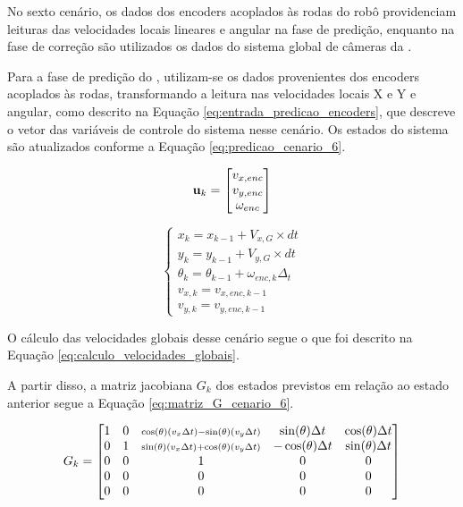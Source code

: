 \documentclass[acronym, symbols, table]{fei}
\begin{document}
			No sexto cenário, os dados dos encoders acoplados às rodas do robô providenciam leituras das velocidades locais lineares e angular na fase de predição, enquanto na fase de correção são utilizados os dados do sistema global de câmeras da .
			
			Para a fase de predição do , utilizam-se os dados provenientes dos encoders acoplados às rodas, transformando a leitura nas velocidades locais X e Y e angular, como descrito na Equação \ref{eq:entrada_predicao_encoders}, que descreve o vetor das variáveis de controle do sistema nesse cenário. Os estados do sistema são atualizados conforme a Equação \ref{eq:predicao_cenario_6}.
			
			\begin{equation}\label{eq:entrada_predicao_encoders}
				\text{\textbf{u}}_k =
				\begin{bmatrix}
					v_{x,enc} \\
					v_{y,enc} \\
					\omega_{enc}
				\end{bmatrix}
			\end{equation}
		
			\begin{equation}\label{eq:predicao_cenario_6}
				\begin{cases}
					x_{k} = x_{k-1} + V_{x,G} \times dt \\
					y_{k} = y_{k-1} + V_{y,G} \times dt \\
					\theta_{k} = \theta_{k-1} + \omega_{enc,k} \Delta_t \\
					v_{x,k} = v_{x,enc,k-1} \\
					v_{y,k} = v_{y,enc,k-1}
				\end{cases}
			\end{equation}
			
			O cálculo das velocidades globais desse cenário segue o que foi descrito na Equação \ref{eq:calculo_velocidades_globais}.
			
			A partir disso, a matriz jacobiana $G_{k}$ dos estados previstos em relação ao estado anterior segue a Equação \ref{eq:matriz_G_cenario_6}.
			
			\renewcommand{\arraystretch}{1.2}
			\begin{equation}\label{eq:matriz_G_cenario_6}
				G_k = 
				\begin{bmatrix}
					1 & 0 & 
					\smash{\scriptstyle 
						\cos(\theta)\left( v_x \Delta t \right) 
						- \sin(\theta)\left( v_y \Delta t \right)} 
					& \sin(\theta) \Delta t 
					& \cos(\theta) \Delta t 
					\\
					0 & 1 & 
					\smash{\scriptstyle 
						\sin(\theta)\left( v_x \Delta t \right) 
						+ \cos(\theta)\left( v_y \Delta t \right)} 
					& -\cos(\theta) \Delta t 
					& \sin(\theta) \Delta t 
					\\
					0 & 0 & 1 & 0 & 0 \\
					0 & 0 & 0 & 0 & 0 \\
					0 & 0 & 0 & 0 & 0 \\
				\end{bmatrix}
			\end{equation}
		
\end{document}
